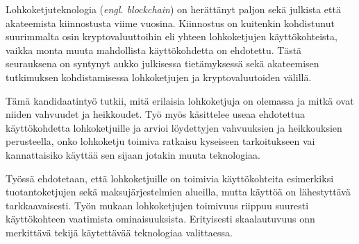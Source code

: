 %
%

\begin{fiabstract}
Lohkoketjuteknologia (\textit{engl. blockchain}) on herättänyt paljon
sekä julkista että akateemista kiinnostusta viime vuosina. Kiinnostus
on kuitenkin kohdistunut suurimmalta osin kryptovaluuttoihin eli
yhteen lohkoketjujen käyttökohteista, vaikka monta muuta mahdollista
käyttökohdetta on ehdotettu. Tästä seurauksena on syntynyt aukko
julkisessa tietämyksessä sekä akateemisen tutkimuksen kohdistamisessa
lohkoketjujen ja kryptovaluutoiden välillä.

Tämä kandidaatintyö tutkii, mitä erilaisia lohkoketjuja on olemassa ja
mitkä ovat niiden vahvuudet ja heikkoudet. Työ myös käsittelee useaa
ehdotettua käyttökohdetta lohkoketjuille ja arvioi löydettyjen
vahvuuksien ja heikkouksien perusteella, onko lohkoketju toimiva
ratkaisu kyseiseen tarkoitukseen vai kannattaisiko käyttää sen sijaan
jotakin muuta teknologiaa.

Työssä ehdotetaan, että lohkoketjuille on toimivia käyttökohteita
esimerkiksi tuotantoketjujen sekä maksujärjestelmien alueilla, mutta
käyttöä on lähestyttävä tarkkaavaisesti. Työn mukaan lohkoketjujen
toimivuus riippuu suuresti käyttökohteen vaatimista ominaisuuksista.
Erityisesti skaalautuvuus onn merkittävä tekijä käytettävää
teknologiaa valittaessa.

%
\end{fiabstract}


